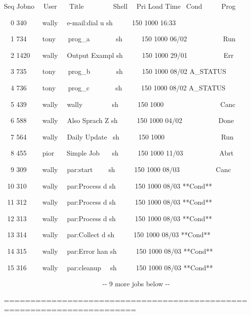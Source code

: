 \begin{expara}

Seq Jobno \ \ User \ \ \ Title \ \ \ \ \ \ \ \ Shell \ \ Pri Load Time
\ Cond \ \ \ \ \ Prog

\ \ 0 340 \ \ \ \ wally \ \ e-mail:dial u sh \ \ \ \ \ 150 1000 16:33

\ \ 1 734 \ \ \ \ tony \ \ \ prog\_a \ \ \ \ \ \ \ sh \ \ \ \ \ 150 1000
06/02 \ \ \ \ \ \ \ \ \ \ Run

\ \ 2 1420 \ \ \ wally \ \ Output Exampl sh \ \ \ \ \ 150 1000 29/01
\ \ \ \ \ \ \ \ \ \ Err

\ \ 3 735 \ \ \ \ tony \ \ \ prog\_b \ \ \ \ \ \ \ sh \ \ \ \ \ 150 1000
08/02 A\_STATUS

\ \ 4 736 \ \ \ \ tony \ \ \ prog\_c \ \ \ \ \ \ \ sh \ \ \ \ \ 150 1000
08/02 A\_STATUS

\ \ 5 439 \ \ \ \ wally \ \ wally \ \ \ \ \ \ \ \ sh \ \ \ \ \ 150 1000
\ \ \ \ \ \ \ \ \ \ \ \ \ \ \ \ Canc

\ \ 6 588 \ \ \ \ wally \ \ Also Sprach Z sh \ \ \ \ \ 150 1000 04/02
\ \ \ \ \ \ \ \ \ \ Done

\ \ 7 564 \ \ \ \ wally \ \ Daily Update \ sh \ \ \ \ \ 150 1000
\ \ \ \ \ \ \ \ \ \ \ \ \ \ \ \ Run

\ \ 8 455 \ \ \ \ pior \ \ \ Simple Job \ \ \ sh \ \ \ \ \ 150 1000
11/03 \ \ \ \ \ \ \ \ \ \ Abrt

\ \ 9 309 \ \ \ \ wally \ \ par:start \ \ \ \ sh \ \ \ \ \ 150 1000
08/03 \ \ \ \ \ \ \ \ \ \ Canc

\ 10 310 \ \ \ \ wally \ \ par:Process d sh \ \ \ \ \ 150 1000 08/03
**Cond**

\ 11 312 \ \ \ \ wally \ \ par:Process d sh \ \ \ \ \ 150 1000 08/03
**Cond**

\ 12 313 \ \ \ \ wally \ \ par:Process d sh \ \ \ \ \ 150 1000 08/03
**Cond**

\ 13 314 \ \ \ \ wally \ \ par:Collect d sh \ \ \ \ \ 150 1000 08/03
**Cond**

\ 14 315 \ \ \ \ wally \ \ par:Error han sh \ \ \ \ \ 150 1000 08/03
**Cond**

\ 15 316 \ \ \ \ wally \ \ par:cleanup \ \ sh \ \ \ \ \ 150 1000 08/03
**Cond**

\ \ \ \ \ \ \ \ \ \ \ \ \ \ \ \ \ \ \ \ \ \ \ \ \ \ \ \ \ {}-{}- 9 more
jobs below -{}-

=======================================================================


\end{expara}


